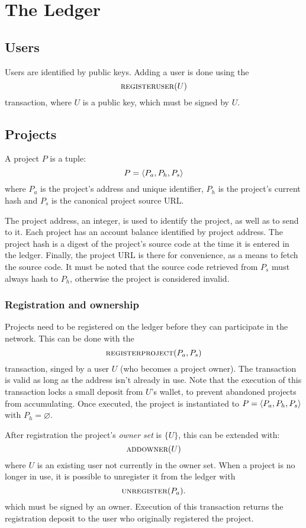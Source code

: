 \section{The \oscoin{} Ledger}

\subsection{Users}

Users are identified by public keys. Adding a user is done using the
\[
    \text{\normalfont\scshape registeruser}\small{\lparen U\rparen}
  \]
transaction, where $U$ is a public key, which must be signed by $U$.

\subsection{Projects}
\label{s:projects}

A project $P$ is a tuple:
\[
    P = \langle P_a, P_h, P_s\rangle
\]
where $P_{a}$ is the project's address and unique identifier, $P_h$ is
the project's current hash and $P_s$ is the canonical project source
URL.

The project address, an integer, is used to identify the project, as
well as to send \oscoin{} to it. Each project has an account balance
identified by project address. The project hash is a digest of the
project's source code at the time it is entered in the
ledger. Finally, the project URL is there for convenience, as a means
to fetch the source code.  It must be noted that the source code
retrieved from $P_s$ must always hash to $P_h$, otherwise the project
is considered invalid.

\subsubsection{Registration and ownership} Projects need to be
registered on the ledger before they can participate in the
network. This can be done with the
\[
    \text{\normalfont\scshape registerproject}\small{\lparen P_a, P_s\rparen}
\]
transaction, singed by a user $U$ (who becomes a project owner). The
transaction is valid as long as the address isn't already in use. Note
that the execution of this transaction locks a small \oscoin{} deposit
from $U$'s wallet, to prevent abandoned projects from
accumulating. Once executed, the project is instantiated to
$P = \langle P_a, P_h, P_s\rangle$ with $P_h = \varnothing$.

After registration the project's \emph{owner set} is $\{U\}$, this can
be extended with:
\[
    \text{\normalfont\scshape addowner}\small{\lparen U\rparen}
\]
where $U$ is an existing user not currently in the owner set.
When a project is no longer in use, it is possible to unregister it from the
ledger with
\[
    \text{\normalfont\scshape unregister}\small{\lparen P_a\rparen}.
\]
which must be signed by an owner. Execution of this transaction
returns the registration deposit to the user who originally registered
the project.

